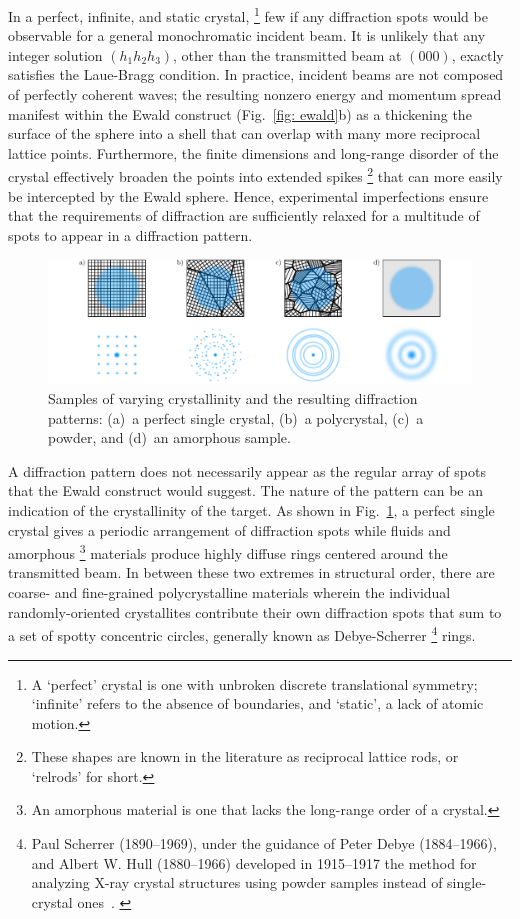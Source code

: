 In a perfect, infinite, and static crystal,%
\footnote{A `perfect' crystal is one with unbroken discrete translational symmetry;
`infinite' refers to the absence of boundaries, and `static', a lack of atomic motion.}
few if any diffraction spots would be observable
for a general monochromatic incident beam.
It is unlikely that any integer solution $(h_1 h_2 h_3)$,
other than the transmitted beam at $(000)$,
exactly satisfies the Laue-Bragg condition.
In practice, incident beams are not composed of
perfectly coherent waves;
the resulting nonzero energy and momentum spread manifest
within the Ewald construct (Fig.~\ref{fig: ewald}b)
as a thickening the surface of the sphere into a shell
that can overlap with many more reciprocal lattice points.
Furthermore, the finite dimensions and long-range disorder
of the crystal effectively broaden the points into extended spikes%
\footnote{These shapes are known in the literature as
reciprocal lattice rods, or `relrods' for short.}
that can more easily be intercepted by the Ewald sphere.
Hence, experimental imperfections ensure that
the requirements of diffraction are sufficiently relaxed
for a multitude of spots to appear in a diffraction pattern.

\begin{figure}[ht!]
  \centering
  \includegraphics[width = \textwidth]{Figures/fig_ch2_crystal-powder-diff.pdf}
  \caption[Samples of varying crystallinity and the resulting diffraction patterns.]{
    Samples of varying crystallinity and the resulting diffraction patterns:
    (a)~a perfect single crystal, (b)~a polycrystal, (c)~a powder,
    and (d)~an amorphous sample.}
  \label{fig: crystal-powder-diff}
\end{figure}

A diffraction pattern does not necessarily appear as
the regular array of spots that the Ewald construct would suggest.
The nature of the pattern can be an indication of the crystallinity
of the target. As shown in Fig.~\ref{fig: crystal-powder-diff},
a perfect single crystal gives a periodic arrangement of diffraction spots
while fluids and amorphous%
\footnote{An amorphous material is one that lacks the long-range order of
a crystal.} materials produce highly diffuse rings centered around the transmitted beam.
%
In between these two extremes in structural order,
there are coarse- and fine-grained polycrystalline materials
wherein the individual randomly-oriented crystallites contribute
their own diffraction spots that sum to a set of spotty concentric circles,
generally known as Debye-Scherrer%
\footnote{Paul Scherrer (1890--1969), under the guidance of Peter Debye (1884--1966), and
Albert W. Hull (1880--1966) developed in 1915--1917 the method for analyzing
X-ray crystal structures using powder samples
instead of single-crystal ones~\cite{EwaldBook, DebyeScherrer2011}.
\label{fn: debye-waller}} rings.

